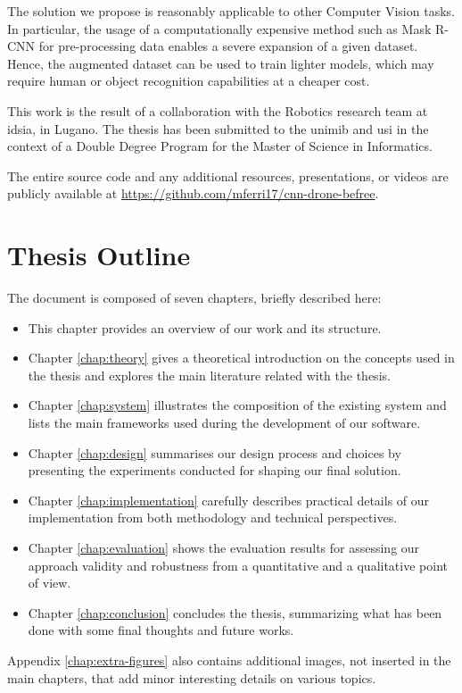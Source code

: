 \medskip

The solution we propose is reasonably applicable to other Computer Vision tasks. In particular, the usage of a computationally expensive method such as Mask R-CNN for pre-processing data enables a severe expansion of a given dataset. Hence, the augmented dataset can be used to train lighter models, which may require human or object recognition capabilities at a cheaper cost.

\clearpage

This work is the result of a collaboration with the Robotics research team at \gls{idsia}, in Lugano. The thesis has been submitted to the \gls{unimib} and \gls{usi} in the context of a Double Degree Program for the Master of Science in Informatics.

The entire source code and any additional resources, presentations, or videos are publicly available at \url{https://github.com/mferri17/cnn-drone-befree}.




\section*{Thesis Outline}
\label{sec:outline}

The document is composed of seven chapters, briefly described here:

\begin{itemize}
	\item This chapter provides an overview of our work and its structure.
	\item Chapter \ref{chap:theory} gives a theoretical introduction on the concepts used in the thesis and explores the main literature related with the thesis.
	\item Chapter \ref{chap:system} illustrates the composition of the existing system and lists the main frameworks used during the development of our software.
	\item Chapter \ref{chap:design} summarises our design process and choices by presenting the experiments conducted for shaping our final solution.
	\item Chapter \ref{chap:implementation} carefully describes practical details of our implementation from both methodology and technical perspectives.
	\item Chapter \ref{chap:evaluation} shows the evaluation results for assessing our approach validity and robustness from a quantitative and a qualitative point of view.
	\item Chapter \ref{chap:conclusion} concludes the thesis, summarizing what has been done with some final thoughts and future works.
\end{itemize}

Appendix \ref{chap:extra-figures} also contains additional images, not inserted in the main chapters, that add minor interesting details on various topics.





